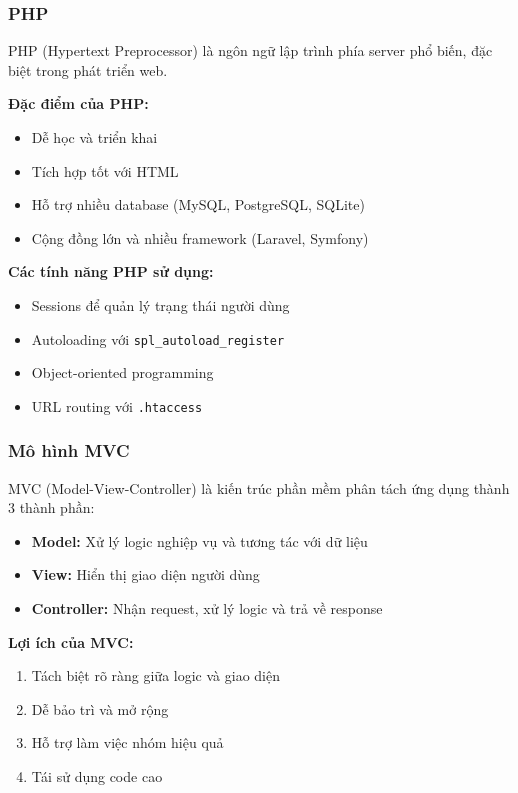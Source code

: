 \subsubsection{PHP}

PHP (Hypertext Preprocessor) là ngôn ngữ lập trình phía server phổ biến, đặc biệt trong phát triển web.

\textbf{Đặc điểm của PHP:}
\begin{itemize}
    \item Dễ học và triển khai
    \item Tích hợp tốt với HTML
    \item Hỗ trợ nhiều database (MySQL, PostgreSQL, SQLite)
    \item Cộng đồng lớn và nhiều framework (Laravel, Symfony)
\end{itemize}

\textbf{Các tính năng PHP sử dụng:}
\begin{itemize}
    \item Sessions để quản lý trạng thái người dùng
    \item Autoloading với \texttt{spl\_autoload\_register}
    \item Object-oriented programming
    \item URL routing với \texttt{.htaccess}
\end{itemize}

\subsubsection{Mô hình MVC}

MVC (Model-View-Controller) là kiến trúc phần mềm phân tách ứng dụng thành 3 thành phần:

\begin{itemize}
    \item \textbf{Model:} Xử lý logic nghiệp vụ và tương tác với dữ liệu
    \item \textbf{View:} Hiển thị giao diện người dùng
    \item \textbf{Controller:} Nhận request, xử lý logic và trả về response
\end{itemize}

\textbf{Lợi ích của MVC:}
\begin{enumerate}
    \item Tách biệt rõ ràng giữa logic và giao diện
    \item Dễ bảo trì và mở rộng
    \item Hỗ trợ làm việc nhóm hiệu quả
    \item Tái sử dụng code cao
\end{enumerate}

